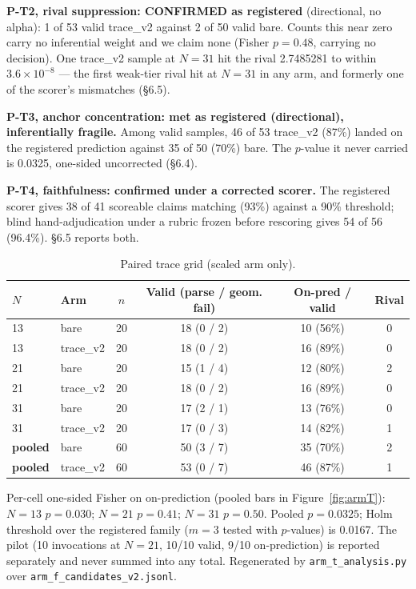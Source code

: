 \textbf{P-T2, rival suppression: CONFIRMED as registered} (directional, no alpha): 1 of 53 valid
trace\_v2 against 2 of 50 valid bare. Counts this near zero carry no inferential weight and we
claim none (Fisher $p = 0.48$, carrying no decision). One trace\_v2 sample at $N = 31$ hit the rival
2.7485281 to within $3.6\times10^{-8}$ --- the first weak-tier rival hit at $N = 31$ in any arm, and formerly
one of the scorer's mismatches (\S6.5).

\textbf{P-T3, anchor concentration: met as registered (directional), inferentially fragile.} Among
valid samples, 46 of 53 trace\_v2 (87\%) landed on the registered prediction against 35 of 50 (70\%)
bare. The $p$-value it never carried is 0.0325, one-sided uncorrected (\S6.4).

\textbf{P-T4, faithfulness: confirmed under a corrected scorer.} The registered scorer gives 38 of 41
scoreable claims matching (93\%) against a 90\% threshold; blind hand-adjudication under a rubric
frozen before rescoring gives 54 of 56 (96.4\%). \S6.5 reports both.

\begin{table}[t]
\centering
\caption{Paired trace grid (scaled arm only).}
\label{tab:tracegrid}
\begin{tabular}{@{}llcccc@{}}
\toprule
$N$ & Arm & $n$ & Valid (parse / geom. fail) & On-pred / valid & Rival \\
\midrule
13 & bare & 20 & 18 (0 / 2) & 10 (56\%) & 0 \\
13 & trace\_v2 & 20 & 18 (0 / 2) & 16 (89\%) & 0 \\
21 & bare & 20 & 15 (1 / 4) & 12 (80\%) & 2 \\
21 & trace\_v2 & 20 & 18 (0 / 2) & 16 (89\%) & 0 \\
31 & bare & 20 & 17 (2 / 1) & 13 (76\%) & 0 \\
31 & trace\_v2 & 20 & 17 (0 / 3) & 14 (82\%) & 1 \\
\textbf{pooled} & bare & 60 & 50 (3 / 7) & 35 (70\%) & 2 \\
\textbf{pooled} & trace\_v2 & 60 & 53 (0 / 7) & 46 (87\%) & 1 \\
\bottomrule
\end{tabular}
\end{table}

Per-cell one-sided Fisher on on-prediction (pooled bars in Figure~\ref{fig:armT}): $N = 13$ $p = 0.030$; $N = 21$ $p = 0.41$; $N = 31$ $p = 0.50$.
Pooled $p = 0.0325$; Holm threshold over the registered family ($m = 3$ tested with $p$-values) is
0.0167. The pilot (10 invocations at $N = 21$, 10/10 valid, 9/10 on-prediction) is reported
separately and never summed into any total. Regenerated by \texttt{arm\_t\_analysis.py} over
\texttt{arm\_f\_candidates\_v2.jsonl}.

